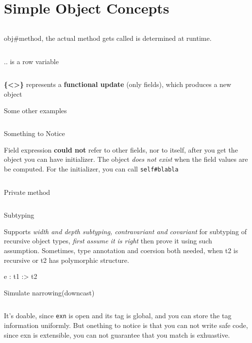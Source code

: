 

\section{Simple Object Concepts}

\inputminted[fontsize=\scriptsize, lastline=8]{ocaml}{oo/code/simple.ml}


obj\#method, the actual method gets called is determined at runtime.


\inputminted[fontsize=\scriptsize, firstline=8,lastline=15]{ocaml}{oo/code/simple.ml}


.. is a row variable 
\inputminted[fontsize=\scriptsize, firstline=15,lastline=18]{ocaml}{oo/code/simple.ml}


\textbf{ \{<>\} }represents a \textbf{functional update} (only
fields), which produces a new object


Some other examples
\inputminted[fontsize=\scriptsize, firstline=18,lastline=67]{ocaml}{oo/code/simple.ml}


Something to Notice

Field expression \textbf{could not} refer to other fields, nor to
itself, after you get the object you can have initializer. The object
\textit{does not exist} when the field values are be computed. For the
initializer, you can call \verb|self#blabla|
\inputminted[fontsize=\scriptsize, firstline=66,lastline=80]{ocaml}{oo/code/simple.ml}


Private method
\inputminted[fontsize=\scriptsize, firstline=81,lastline=88]{ocaml}{oo/code/simple.ml}


Subtyping


Supports \textit{width and depth subtyping, contravariant and
  covariant} for subtyping of recursive object types, \textit{first
  assume it is right} then prove it using such assumption. Sometimes,
type annotation and coersion both needed, when t2 is recursive or t2
has polymorphic structure.

\begin{ocamlcode}
  e : t1 :> t2
\end{ocamlcode}


Simulate narrowing(downcast)

\inputminted[fontsize=\scriptsize, ]{ocaml}{oo/code/downcast.ml}

It's doable, since \verb|exn| is open and its tag is global, and you
can store the tag information uniformly. But onething to notice is
that you can not write safe code, since exn is extensible, you can not
guarantee that you match is exhuastive.

